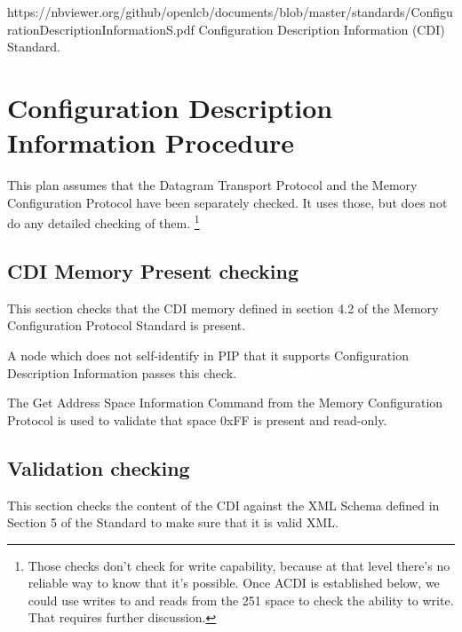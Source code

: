



\maketitle
\thispagestyle{firststyle}

\introductionCaveats
    {https://nbviewer.org/github/openlcb/documents/blob/master/standards/ConfigurationDescriptionInformationS.pdf}
    {Configuration Description Information (CDI) Standard}.

\section{Configuration Description Information Procedure}


This plan assumes that the Datagram Transport Protocol and the Memory Configuration Protocol 
have been separately checked. It uses those, but does not do any detailed checking of them.
\footnote{Those checks don't check for write capability, because at that level
    there's no reliable way to know that it's possible. 
    Once ACDI is established below, we could use writes to and reads from the
    251 space to check the ability to write.
    That requires further discussion.
}

\subsection{CDI Memory Present checking}

This section checks that the CDI memory defined in section 4.2 of the Memory
Configuration Protocol Standard is present.

A node which does not self-identify in PIP that it supports
Configuration Description Information passes this check.

The Get Address Space Information Command from the Memory Configuration Protocol
is used to validate that space 0xFF is present and read-only.

\subsection{Validation checking}

This section checks the content of the CDI against the XML Schema 
defined in Section 5 of the Standard to make sure that it is valid XML. 

